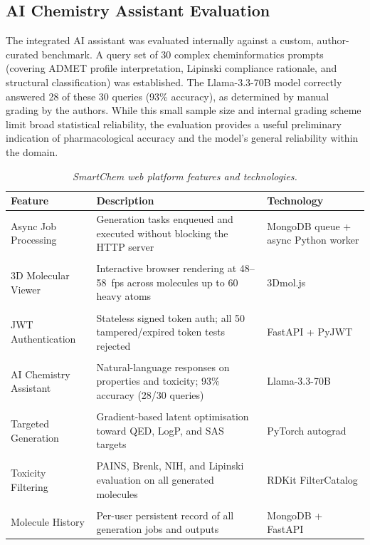 \documentclass[12pt,a4paper]{report}
\begin{document}
\subsection{AI Chemistry Assistant Evaluation}

The integrated AI assistant was evaluated internally against a custom, author-curated benchmark. A query set of 30 complex cheminformatics prompts (covering ADMET profile interpretation, Lipinski compliance rationale, and structural classification) was established. The Llama-3.3-70B model correctly answered 28 of these 30 queries (93\% accuracy), as determined by manual grading by the authors. While this small sample size and internal grading scheme limit broad statistical reliability, the evaluation provides a useful preliminary indication of pharmacological accuracy and the model's general reliability within the domain.

\begin{table}[htbp]
\centering
\caption{\textit{SmartChem web platform features and technologies.}}
\label{tab:platform_features}
\renewcommand{\arraystretch}{1.1}
\setlength{\tabcolsep}{4pt}
\footnotesize
\begin{tabular}{lp{5.5cm}p{4.3cm}}
\hline
\textbf{Feature} & \textbf{Description} & \textbf{Technology} \\
\hline
Async Job Processing   & Generation tasks enqueued and executed without blocking the HTTP server & MongoDB queue + async Python worker \\
\\
3D Molecular Viewer    & Interactive browser rendering at 48--58~fps across molecules up to 60 heavy atoms & 3Dmol.js \\
\\
JWT Authentication     & Stateless signed token auth; all 50 tampered/expired token tests rejected & FastAPI + PyJWT \\
\\
AI Chemistry Assistant & Natural-language responses on properties and toxicity; 93\% accuracy (28/30 queries) & Llama-3.3-70B \\
\\
Targeted Generation    & Gradient-based latent optimisation toward QED, LogP, and SAS targets & PyTorch autograd \\
\\
Toxicity Filtering     & PAINS, Brenk, NIH, and Lipinski evaluation on all generated molecules & RDKit FilterCatalog \\
\\
Molecule History       & Per-user persistent record of all generation jobs and outputs & MongoDB + FastAPI \\
\hline
\end{tabular}
\end{table}
\end{document}
